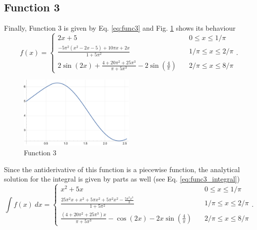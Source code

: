 \subsection{Function 3}
Finally, Function 3 is given by Eq. \eqref{eq:func3} and Fig. \ref{fig:func3} shows its behaviour
\begin{equation}
    \label{eq:func3}
    f(x) = 
    \begin{cases}
        2x + 5 \quad &0 \leq x \leq 1/\pi \\
        \frac{-5\pi^2(x^2-2x-5) + 10\pi x + 2x}{1 + 5\pi^2} \quad &1/\pi \leq x \leq 2/\pi\\
        2\sin(2x) + \frac{4+20\pi^2+25\pi^3}{\pi + 5\pi^3} - 2\sin\left(\frac{4}{\pi}\right) \quad &2/\pi \leq x \leq 8/\pi
    \end{cases}.
\end{equation}
\begin{figure}[H]
    \centering
    \includegraphics[width=0.5\textwidth]{../Figures/func3.pdf}
    \caption{Function 3}
    \label{fig:func3}
\end{figure}

Since the antiderivative of this function is a piecewise function, the analytical solution for the integral is given by parts as well (see Eq. \eqref{eq:func3_integral})
\begin{equation}
    \label{eq:func3_integral}
    \int f(x) ~dx = 
    \begin{cases}
        x^2 + 5x \quad &0 \leq x \leq 1/\pi \\
        \frac{25\pi^2x + x^2 + 5\pi x^2 + 5\pi^2x^2 - \frac{5\pi^2x^3}{3}}{1+5\pi^2} \quad &1/\pi \leq x \leq 2/\pi\\
        \frac{(4+20\pi^2+25\pi^3)x}{\pi + 5\pi^3} -\cos(2x) - 2x\sin\left(\frac{4}{\pi}\right) \quad &2/\pi \leq x \leq 8/\pi
    \end{cases}.
\end{equation} 